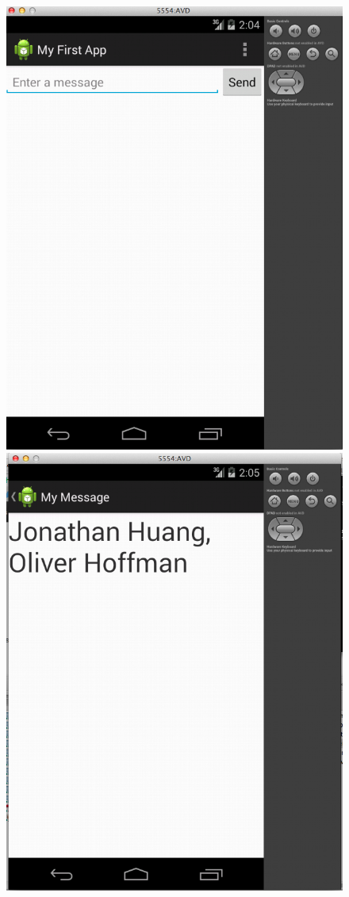 \documentclass[11pt]{article}
\begin{document}
\begin{figure}[h]
\centering
  \includegraphics[scale=0.25]{home.png}
  \includegraphics[scale=0.25]{names.png}
\end{figure}
\end{document}
